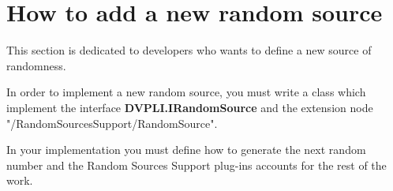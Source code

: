 \section{How to add a new random source}
\label{sec.dev}
This section is dedicated to developers who wants  to define a new source of 
randomness.

In order to implement a new random source, you must write a
class which implement the interface \textbf{DVPLI.IRandomSource} and the extension node "/RandomSourcesSupport/RandomSource". 

In your implementation you must define how to generate the next random number and  the Random Sources Support plug-ins accounts for the rest of the work.






